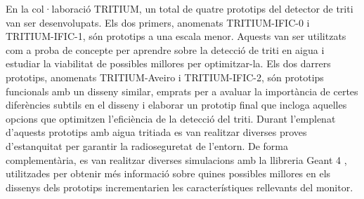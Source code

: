 En la col·laboració TRITIUM, un total de quatre prototips del detector de triti van ser desenvolupats. Els dos primers, anomenats TRITIUM-IFIC-0 i TRITIUM-IFIC-1, són prototips a una escala menor. Aquests van ser utilitzats com a proba de concepte per aprendre sobre la detecció de triti en aigua i estudiar la viabilitat de possibles millores per optimitzar-la. Els dos darrers prototips, anomenats TRITIUM-Aveiro i TRITIUM-IFIC-2, són prototips funcionals amb un disseny similar, emprats per a avaluar la importància de certes diferències subtils en el disseny i elaborar un prototip final que incloga aquelles opcions que optimitzen l'eficiència de la detecció del triti. Durant l'emplenat d'aquests prototips amb aigua tritiada es van realitzar diverses proves d'estanquitat per garantir la radioseguretat de l'entorn. De forma complementària, es van realitzar diverses simulacions amb la llibreria Geant 4 \cite{Geant4WebPage}, utilitzades per obtenir més informació sobre quines possibles millores en els dissenys dels prototips incrementarien les característiques rellevants del monitor.